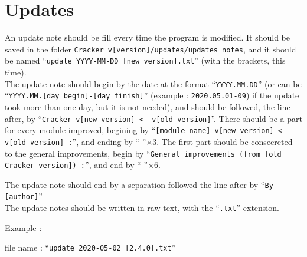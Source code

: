 \documentclass[a4paper,10pt]{report}
\begin{document}
  \section{Updates}
   An update note should be fill every time the program is modified. It should be saved in the folder \texttt{Cracker\_v[version]/updates/updates\_notes}, and it should be named ``\texttt{update\_YYYY-MM-DD\_[new version].txt}'' (with the brackets, this time). \\
   
   The update note should begin by the date at the format ``\texttt{YYYY.MM.DD}'' (or can be ``\texttt{YYYY.MM.[day begin]-[day finish]}'' (example : \texttt{2020.05.01-09}) if the update took more than one day, but it is not needed), and should be followed, the line after, by ``\texttt{Cracker v[new version] <-- v[old version]}''. There should be a part for every module improved, begining by ``\texttt{[module name] v[new version] <-- v[old version] :}'', and ending by ``-''$\times 3$. The first part should be consecreted to the general improvements, begin by ``\texttt{General improvements (from [old Cracker version]) :}'', and end by ``-''$\times 6$.
   
   \noindent The update note should end by a separation followed the line after by ``\texttt{By [author]}'' \\
   
   \noindent The update notes should be written in raw text, with the ``\texttt{.txt}'' extension. \newline \newline
   
   
   
   \noindent Example :
   
   file name : ``\texttt{update\_2020-05-02\_[2.4.0].txt}'' \\
   
\end{document}
